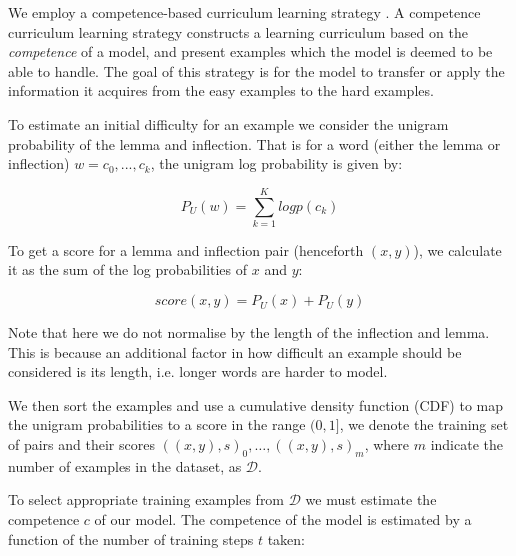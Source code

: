 \documentclass[11pt,a4paper]{article}
\begin{document}
We employ a competence-based curriculum learning strategy
\cite{DBLP:conf/acl/LiuLWC20, platanios2019competence}. A competence
curriculum learning strategy constructs a learning curriculum based on
the \textit{competence} of a model, and present examples which the
model is deemed to be able to handle. The goal of this
strategy is for the model to transfer or apply the information it
acquires from the easy examples to the hard examples.
 
To estimate an initial difficulty for an example we consider the
unigram probability of the lemma and inflection. That is for a word
(either the lemma or inflection) $w = c_0, ..., c_k$, the unigram log
probability is given by:

\begin{equation}
    P_U(w) = \sum_{k=1}^{K} logp(c_k)
\end{equation}

To get a score for a lemma and inflection pair (henceforth $(x,y)$),
we calculate it as the sum of the log probabilities of $x$ and $y$:

\begin{equation}
    score(x,y) = P_U(x) + P_U(y)
\end{equation}

Note that here we do not normalise by the length of the inflection and
lemma. This is because an additional factor in how difficult an
example should be considered is its length, i.e. longer words are
harder to model.

We then sort the examples and use a cumulative density function (CDF)
to map the unigram probabilities to a score in the range $(0, 1]$, we
denote the training set of pairs and their scores
$((x,y), s)_0, \ldots, ((x,y), s)_m$, where $m$ indicate the number of
examples in the dataset, as $\mathcal{D}$.

% 
%
To select appropriate training examples from $\mathcal{D}$ we must
estimate the competence $c$ of our model. The competence of the model
is estimated by a function of the number of training steps $t$ taken:

\end{document}
